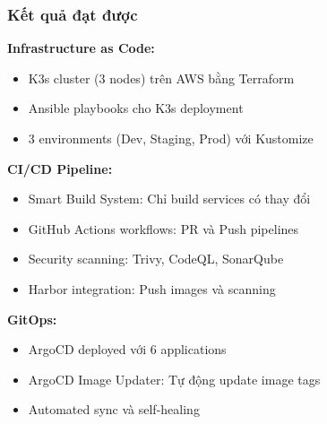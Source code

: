 \documentclass[aspectratio=169]{beamer}
\begin{document}
\begin{frame}
\frametitle{Kết quả đạt được}
\textbf{Infrastructure as Code:}
\begin{itemize}
    \item[$\checkmark$] K3s cluster (3 nodes) trên AWS bằng Terraform
    \item[$\checkmark$] Ansible playbooks cho K3s deployment
    \item[$\checkmark$] 3 environments (Dev, Staging, Prod) với Kustomize
\end{itemize}

\vspace{0.3cm}
\textbf{CI/CD Pipeline:}
\begin{itemize}
    \item[$\checkmark$] Smart Build System: Chỉ build services có thay đổi
    \item[$\checkmark$] GitHub Actions workflows: PR và Push pipelines
    \item[$\checkmark$] Security scanning: Trivy, CodeQL, SonarQube
    \item[$\checkmark$] Harbor integration: Push images và scanning
\end{itemize}

\vspace{0.3cm}
\textbf{GitOps:}
\begin{itemize}
    \item[$\checkmark$] ArgoCD deployed với 6 applications
    \item[$\checkmark$] ArgoCD Image Updater: Tự động update image tags
    \item[$\checkmark$] Automated sync và self-healing
\end{itemize}
\end{frame}
\end{document}
